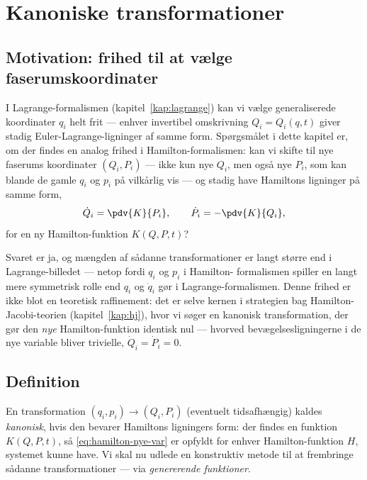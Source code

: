 
\chapter{Kanoniske transformationer}
\label{kap:kanoniske-transf}

\section{Motivation: frihed til at vælge faserumskoordinater}

I Lagrange-formalismen (kapitel~\ref{kap:lagrange}) kan vi vælge
generaliserede koordinater $q_i$ helt frit — enhver invertibel
omskrivning $Q_i=Q_i(q,t)$ giver stadig Euler-Lagrange-ligninger af
samme form. Spørgsmålet i dette kapitel er, om der findes en analog
frihed i Hamilton-formalismen: kan vi skifte til nye faserums\-
koordinater $(Q_i,P_i)$ — ikke kun nye $Q_i$, men også nye $P_i$, som
kan blande de gamle $q_i$ og $p_i$ på vilkårlig vis — og stadig have
Hamiltons ligninger på samme form,
\begin{equation}
  \dot Q_i = \pdv{K}{P_i}, \qquad \dot P_i = -\pdv{K}{Q_i},
  \label{eq:hamilton-nye-var}
\end{equation}
for en ny Hamilton-funktion $K(Q,P,t)$?

Svaret er ja, og mængden af sådanne transformationer er langt større
end i Lagrange-billedet — netop fordi $q_i$ og $p_i$ i Hamilton-
formalismen spiller en langt mere symmetrisk rolle end $q_i$ og
$\dot q_i$ gør i Lagrange-formalismen. Denne frihed er ikke blot en
teoretisk raffinement: det er selve kernen i strategien bag
Hamilton-Jacobi-teorien (kapitel~\ref{kap:hj}), hvor vi søger en
kanonisk transformation, der gør den \emph{nye} Hamilton-funktion
identisk nul — hvorved bevægelsesligningerne i de nye variable bliver
trivielle, $\dot Q_i=\dot P_i=0$.

\section{Definition}

En transformation $(q_i,p_i)\to(Q_i,P_i)$ (eventuelt tidsafhængig)
kaldes \emph{kanonisk}, hvis den bevarer Hamiltons ligningers form: der
findes en funktion $K(Q,P,t)$, så \eqref{eq:hamilton-nye-var} er
opfyldt for enhver Hamilton-funktion $H$, systemet kunne have. Vi skal
nu udlede en konstruktiv metode til at frembringe sådanne
transformationer — via \emph{genererende funktioner}.

